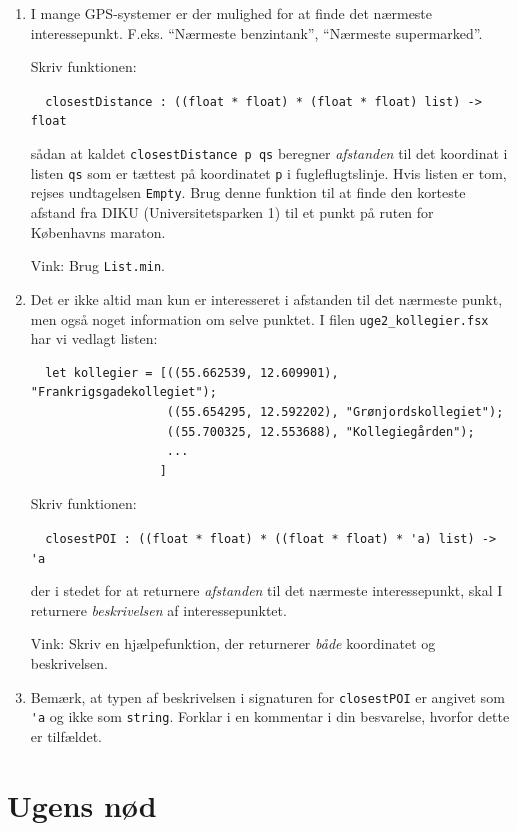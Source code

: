 \documentclass[a4paper,12pt]{article}
\begin{document}
\begin{enumerate}[{2I}1]

\item I mange GPS-systemer er der mulighed for at finde det nærmeste
  interessepunkt. F.eks. "`Nærmeste benzintank"', "`Nærmeste
  supermarked"'.

  Skriv funktionen:

  \verb|  closestDistance : ((float * float) * (float * float) list) -> float|

  sådan at kaldet \verb|closestDistance p qs| beregner
  \textit{afstanden} til det koordinat i listen \verb|qs| som er
  tættest på koordinatet \verb|p| i fugleflugtslinje.  Hvis listen er tom, rejses
  undtagelsen \verb|Empty|.  Brug denne funktion til at finde den
  korteste afstand fra DIKU (Universitetsparken 1) til et punkt på
  ruten for Københavns maraton.

  Vink: Brug \verb|List.min|.

\item Det er ikke altid man kun er interesseret i afstanden til det
  nærmeste punkt, men også noget information om selve punktet. I filen
  \verb|uge2_kollegier.fsx| har vi vedlagt listen:
  \begin{verbatim}
  let kollegier = [((55.662539, 12.609901), "Frankrigsgadekollegiet");
                   ((55.654295, 12.592202), "Grønjordskollegiet");
                   ((55.700325, 12.553688), "Kollegiegården");
                   ...
                  ]
  \end{verbatim}
  Skriv funktionen:

  \verb|  closestPOI : ((float * float) * ((float * float) * 'a) list) -> 'a|

  der i stedet for at returnere \textit{afstanden} til det nærmeste
  interessepunkt, skal I returnere \textit{beskrivelsen} af
  interessepunktet.

  Vink: Skriv en hjælpefunktion, der returnerer \textit{både}
  koordinatet og beskrivelsen.

\item Bemærk, at typen af beskrivelsen i signaturen for \verb|closestPOI|
  er angivet som \verb|'a| og ikke som \verb|string|.  Forklar i en
  kommentar i din besvarelse, hvorfor dette er tilfældet.

\end{enumerate}

\section{Ugens nød}
\label{sec:ugens-nod}
\end{document}
